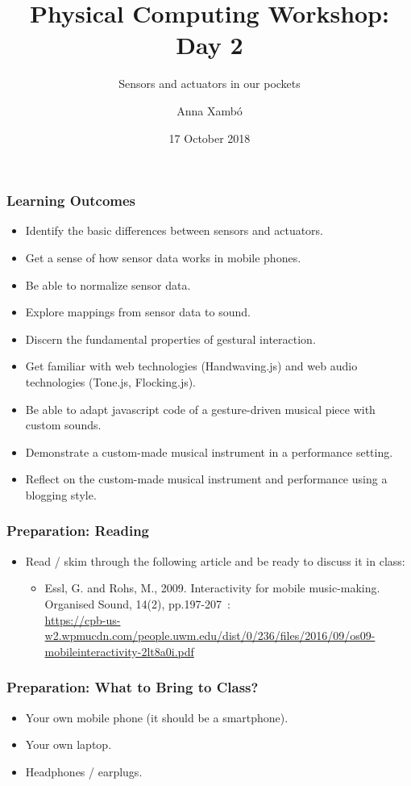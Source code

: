 \documentclass[screen, aspectratio=43]{beamer}
\title[PCW-d1]{Physical Computing Workshop: Day 2}
\subtitle{Sensors and actuators in our pockets}
\author[A. Xamb{\'o}]{Anna Xamb{\'o}}
\institute[NTNU]{Department of Music, NTNU}
\date{17 October 2018}
\begin{document}
\begin{frame}
  \titlepage
\end{frame}
%
\begin{frame}
  \frametitle{Learning Outcomes}
  \begin{itemize}
    \item Identify the basic differences between sensors and actuators.
    \item Get a sense of how sensor data works in mobile phones.
    \item Be able to normalize sensor data.
    \item Explore mappings from sensor data to sound.
    \item Discern the fundamental properties of gestural interaction.   
    \item Get familiar with web technologies (Handwaving.js) and web audio technologies (Tone.js, Flocking.js).
    \item Be able to adapt javascript code of a gesture-driven musical piece with custom sounds.     
    \item Demonstrate a custom-made musical instrument in a performance setting.
    \item Reflect on the custom-made musical instrument and performance using a blogging style.   
  \end{itemize}
\end{frame}
%
\begin{frame}
  \frametitle{Preparation: Reading}
        \begin{itemize}
        \item Read / skim through the following article and be ready to discuss it in class:
         \begin{itemize}
         \item Essl, G. and Rohs, M., 2009. Interactivity for mobile music-making. Organised Sound, 14(2), pp.197-207~\cite{Essl.Rohs.2009.interactivity}:\\
         \url{https://cpb-us-w2.wpmucdn.com/people.uwm.edu/dist/0/236/files/2016/09/os09-mobileinteractivity-2lt8a0i.pdf}
         \end{itemize}    
         \end{itemize}
\end{frame}
%
\begin{frame}
  \frametitle{Preparation: What to Bring to Class?}
        \begin{itemize}
        \item Your own mobile phone (it should be a smartphone).
        \item Your own laptop.
        \item Headphones / earplugs.
         \end{itemize}
\end{frame}
\end{document}
